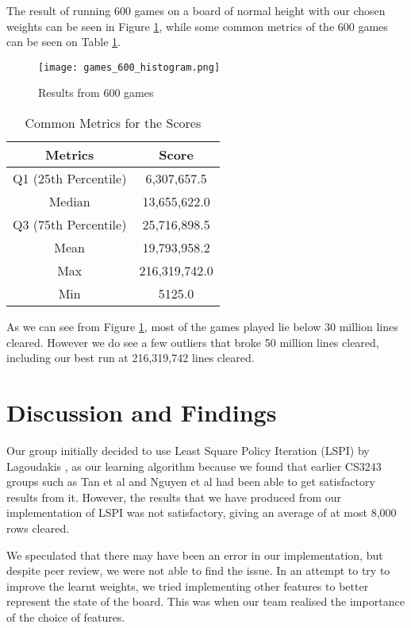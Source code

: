 \documentclass[a4paper,12pt,twocolumn]{article}
\begin{document}
The result of running 600 games on a board of normal height with our chosen weights
can be seen in Figure \ref{score_histogram}, while some common metrics of the
600 games can be seen on Table \ref{metric_scores}.

\begin{figure}[H]
    \centering
    \texttt{[image: games\_600\_histogram.png]}
    \caption{Results from 600 games}
    \label{score_histogram}
\end{figure}

\begin{table}[H]
    \centering
	\begin{tabular}{|c|c|}
		\hline
		\textbf{Metrics}   & \textbf{Score}     \\
		\hline
		Q1 (25th Percentile)  & 6,307,657.5 \\
		\hline
		Median         & 13,655,622.0  \\
		\hline
		Q3 (75th Percentile)      & 25,716,898.5 \\
		\hline
		Mean & 19,793,958.2 \\
		\hline
		Max     & 216,319,742.0  \\
		\hline
		Min          & 5125.0 \\
		\hline
	\end{tabular}
	\caption{Common Metrics for the Scores}
	\label{metric_scores}
\end{table}

As we can see from Figure \ref{score_histogram}, most of the games played lie below 30 million lines
cleared. However we do see a few outliers that broke 50 million lines cleared, including
our best run at 216,319,742 lines cleared.

\section{Discussion and Findings}
\label{discussion_n_findings}
Our group initially decided to use Least Square Policy Iteration (LSPI) by Lagoudakis \cite{lagoudakis},
as our learning algorithm because we found that earlier CS3243 groups such as
Tan et al \cite{shawntan} and Nguyen et al \cite{nhannguyen} had been able to get
satisfactory results from it. However, the results that we have produced from our
implementation of LSPI was not satisfactory, giving an average of at most 8,000 rows
cleared.

We speculated that there may have been an error in our implementation, but despite
peer review, we were not able to find the issue. In an attempt to try to improve the
learnt weights, we tried implementing other features to better represent the state
of the board. This was when our team realised the importance of the choice of features.
\end{document}

